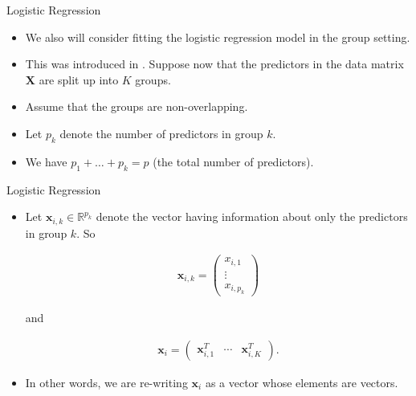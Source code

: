 \documentclass[8pt]{beamer}
\begin{document}
\begin{frame}{Logistic Regression}
\begin{itemize}
    \item We also will consider fitting the logistic regression model in the group setting. 
    
    \item This was introduced in \cite{meier2008group}. Suppose now that the predictors in the data matrix $\mathbf{X}$ are split up into $K$ groups.  
    
    \item Assume that the groups are non-overlapping. 
    
    \item Let $p_k$ denote the number of predictors in group $k$. 
    
    \item We have $p_1 + \ldots + p_k = p$ (the total number of predictors). 
    
    
\end{itemize}
\end{frame}

\begin{frame}{Logistic Regression}
\begin{itemize}
     \item Let $\bm{x}_{i,k} \in \mathbb{R}^{p_k}$ denote the vector having information about only the predictors in group $k$. So 
    
\begin{align*}
    \bm{x}_{i,k} = \begin{pmatrix}
        x_{i,1} \\ \vdots \\ x_{i, p_k}
        \end{pmatrix}
\end{align*}

and

\begin{align*}
    \bm{x}_i = \begin{pmatrix}
    \bm{x}_{i,1}^T & \cdots & \bm{x}_{i,K}^T
    \end{pmatrix}.
\end{align*}

    \item In other words, we are re-writing $\bm{x}_i$ as a vector whose elements are vectors. 
\end{itemize}
\end{frame}
\end{document}
